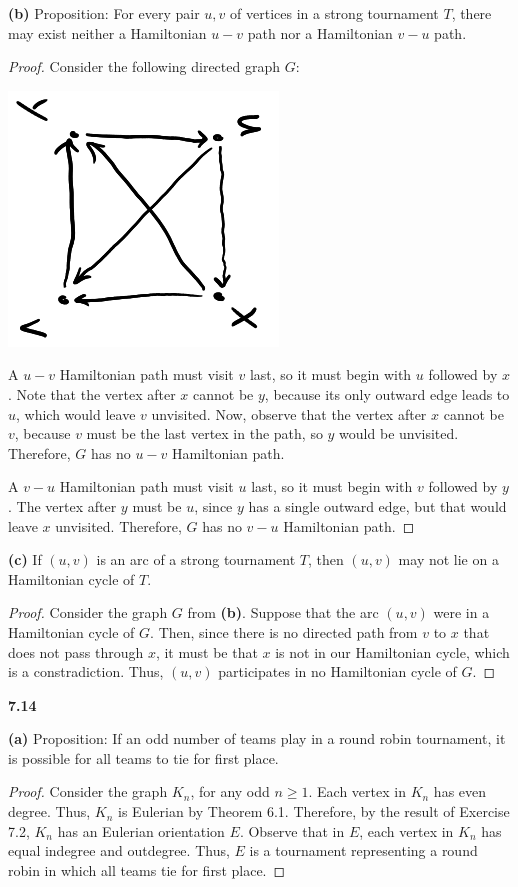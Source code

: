 \documentclass[12pt]{article}
\begin{document}
\textbf{(b)} Proposition: For every pair $u,v$ of vertices in a strong tournament $T$, there may exist neither a Hamiltonian $u-v$ path nor a Hamiltonian $v-u$ path.
\begin{proof}
	Consider the following directed graph $G$:
	\begin{center}\includegraphics[angle=90]{712b.png}\end{center}

	A $u-v$ Hamiltonian path must visit $v$ last, so it must begin with $u$ followed by $x$.
	Note that the vertex after $x$ cannot be $y$, because its only outward edge leads to $u$, which would leave $v$ unvisited.
	Now, observe that the vertex after $x$ cannot be $v$, because $v$ must be the last vertex in the path, so $y$ would be unvisited.
	Therefore, $G$ has no $u-v$ Hamiltonian path.
	
	A $v-u$ Hamiltonian path must visit $u$ last, so it must begin with $v$ followed by $y$.
	The vertex after $y$ must be $u$, since $y$ has a single outward edge, but that would leave $x$ unvisited.
	Therefore, $G$ has no $v-u$ Hamiltonian path.
\end{proof}

\textbf{(c)} If $(u,v)$ is an arc of a strong tournament $T$, then $(u,v)$ may not lie on a Hamiltonian cycle of $T$.
\begin{proof}
	Consider the graph $G$ from \textbf{(b)}.
	Suppose that the arc $(u,v)$ were in a Hamiltonian cycle of $G$.
	Then, since there is no directed path from $v$ to $x$ that does not pass through $x$, it must be that $x$ is not in our Hamiltonian cycle, which is a constradiction.
	Thus, $(u,v)$ participates in no Hamiltonian cycle of $G$.
\end{proof}

\newpage\noindent\textbf{7.14}

\textbf{(a)} Proposition: If an odd number of teams play in a round robin tournament, it is possible for all teams to tie for first place.
\begin{proof}
	Consider the graph $K_n$, for any odd $n \geq 1$.
	Each vertex in $K_n$ has even degree.
	Thus, $K_n$ is Eulerian by Theorem 6.1.
	Therefore, by the result of Exercise 7.2, $K_n$ has an Eulerian orientation $E$.
	Observe that in $E$, each vertex in $K_n$ has equal indegree and outdegree.
	Thus, $E$ is a tournament representing a round robin in which all teams tie for first place.
\end{proof}
\end{document}
